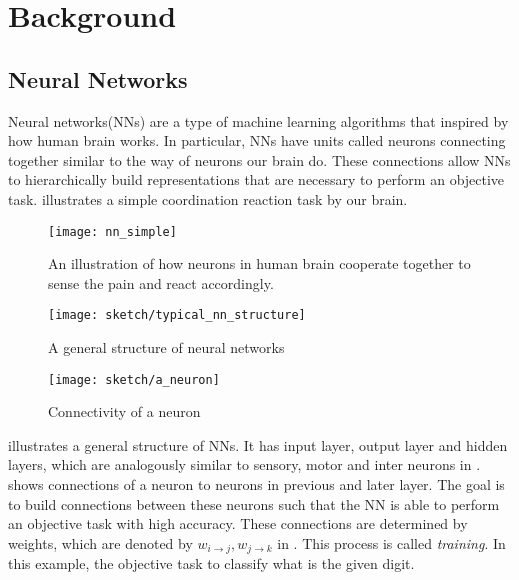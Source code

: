 \chapter{Background}\label{cha:chapter3}

\section{Neural Networks}
Neural networks(NNs) are a type of machine learning algorithms that inspired by how human brain works.  In particular, NNs have units called neurons connecting together similar to the way of neurons our brain do. These connections allow NNs to hierarchically build representations that are necessary to perform an objective task. \addfigure{\ref{fig:nn_simple}} illustrates a simple coordination reaction task by our brain.

 \begin{figure}[ht!]
    \begin{center}

\texttt{[image: nn\_simple]}
\caption[xxx]{An illustration of how neurons in human brain cooperate together to sense the pain and react accordingly. \footnotemark}
\label{fig:nn_simple}

\end{center}
\end{figure}


 \begin{figure}[ht!]
    \begin{center}

\texttt{[image: sketch/typical\_nn\_structure]}
\caption[]{A general structure of neural networks}
\label{fig:nn_typical_structure}

\end{center}
\end{figure}


 \begin{figure}[ht!]
	\begin{center}

		\texttt{[image: sketch/a\_neuron]}
		\caption{Connectivity of a neuron}
		\label{fig:a_neuron}
	\end{center}
\end{figure}


\addfigure{\ref{fig:nn_typical_structure}} illustrates a general structure of NNs. It has input layer, output layer and hidden layers, which are analogously similar to sensory, motor and inter neurons in \addfigure{\ref{fig:nn_simple}}. \addfigure{\ref{fig:a_neuron}} shows connections of a neuron to neurons in previous and later layer. The goal is to build connections between these neurons such that the NN is able to perform an objective task with high accuracy.  These connections are determined by weights, which are denoted by $w_{i\rightarrow j}, w_{j\rightarrow k}$ in \addfigure{\ref{fig:a_neuron}}. This process is called \textit{training}.  In this example, the objective task to classify what is the given digit.



